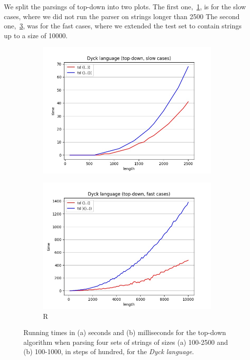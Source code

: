 We split the parsings of top-down into two plots.
The first one,~\cref{fig:t_dyck_td_slow}, is for the slow cases, where we did not run the parser on strings longer than 2500
The second one,~\cref{fig:t_dyck_td_fast}, was for the fast cases, where we extended the test set to contain strings up to a size of 10000.

\begin{figure}[!ht]
    \centering
    \begin{subfigure}[b]{0.48\textwidth}
        \includegraphics[width=1.1\textwidth]{Resources/t_dyck_td_slow.jpg}
        \caption{}
        \label{fig:t_dyck_td_slow}
    \end{subfigure}
    \hfill
    \begin{subfigure}[b]{0.48\textwidth}
        \includegraphics[width=1.1\textwidth]{Resources/t_dyck_td_fast.jpg}
    \caption{R}
    \label{fig:t_dyck_td_fast}
    \end{subfigure}
    \caption{Running times in (a) seconds and (b) milliseconds for the top-down algorithm when parsing four sets of strings of sizes (a) 100-2500 and (b) 100-1000, in steps of hundred, for the \textit{Dyck language}.}
\end{figure}

